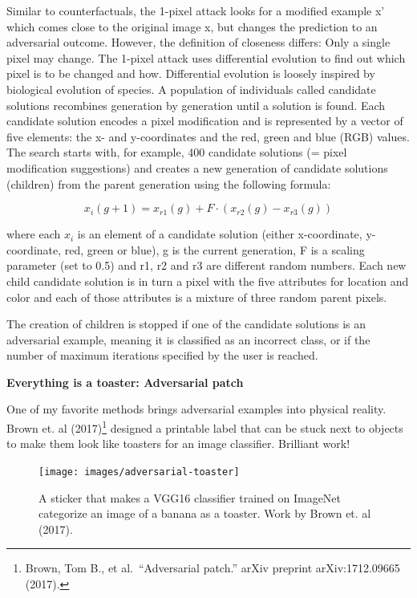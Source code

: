 \documentclass[
  12pt,
]{krantz}
\begin{document}
Similar to counterfactuals, the 1-pixel attack looks for a modified example x' which comes close to the original image x, but changes the prediction to an adversarial outcome.
However, the definition of closeness differs: Only a single pixel may change.
The 1-pixel attack uses differential evolution to find out which pixel is to be changed and how.
Differential evolution is loosely inspired by biological evolution of species.
A population of individuals called candidate solutions recombines generation by generation until a solution is found.
Each candidate solution encodes a pixel modification and is represented by a vector of five elements: the x- and y-coordinates and the red, green and blue (RGB) values.
The search starts with, for example, 400 candidate solutions (= pixel modification suggestions) and creates a new generation of candidate solutions (children) from the parent generation using the following formula:

\[x_{i}(g+1)=x_{r1}(g)+F\cdot(x_{r2}(g)-x_{r3}(g))\]

where each \(x_i\) is an element of a candidate solution (either x-coordinate, y-coordinate, red, green or blue), g is the current generation, F is a scaling parameter (set to 0.5) and r1, r2 and r3 are different random numbers.
Each new child candidate solution is in turn a pixel with the five attributes for location and color and each of those attributes is a mixture of three random parent pixels.

The creation of children is stopped if one of the candidate solutions is an adversarial example, meaning it is classified as an incorrect class, or if the number of maximum iterations specified by the user is reached.

\textbf{Everything is a toaster: Adversarial patch}

One of my favorite methods brings adversarial examples into physical reality.
Brown et. al (2017)\footnote{Brown, Tom B., et al.~``Adversarial patch.'' arXiv preprint arXiv:1712.09665 (2017).} designed a printable label that can be stuck next to objects to make them look like toasters for an image classifier.
Brilliant work!

\begin{figure}

{\centering \texttt{[image: images/adversarial-toaster]} 

}

\caption{A sticker that makes a VGG16 classifier trained on ImageNet categorize an image of a banana as a toaster. Work by Brown et. al (2017).}\label{fig:adversarial-toaster}
\end{figure}
\end{document}

